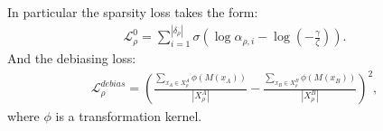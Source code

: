 \documentclass[letterpaper,10pt,english]{sphinxmanual}
\begin{document}
\sphinxAtStartPar
In particular the sparsity loss takes the form:
\begin{equation*}
\begin{split}\mathcal{L}_{\rho}^{0} = \sum_{i=1}^{|\delta_{\rho}|} \sigma\left( \log \alpha_{\rho, i} - \log\left(- \frac{\gamma}{\zeta}\right) \right).\end{split}
\end{equation*}
\sphinxAtStartPar
And the debiasing loss:
\begin{equation*}
\begin{split}\mathcal{L}_{\rho}^{debias} = \left(\frac{\sum_{x_A \in X^A_\rho} \phi (M(x_A))}{|X_{\rho}^A |} - \frac{\sum_{x_B \in X^B_\rho} \phi (M(x_B))}{|X_{\rho}^B|} \right)^2,\end{split}
\end{equation*}
\sphinxAtStartPar
where \(\phi\) is a transformation kernel.
\end{document}
